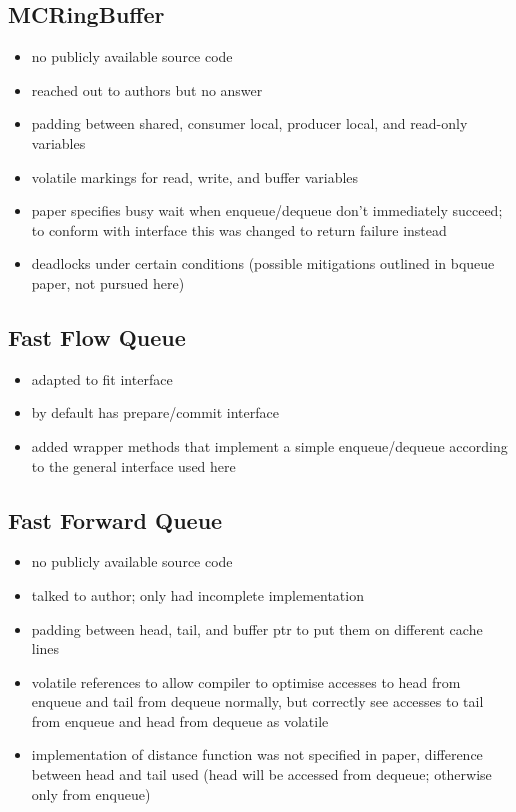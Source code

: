 \subsection{MCRingBuffer}
\begin{itemize}
    \item no publicly available source code
    \item reached out to authors but no answer
    \item padding between shared, consumer local, producer local, and read-only variables
    \item volatile markings for read, write, and buffer variables
    \item paper specifies busy wait when enqueue/dequeue don't immediately succeed; to conform with interface this was changed to return failure instead
    \item deadlocks under certain conditions (possible mitigations outlined in bqueue paper, not pursued here)
\end{itemize}

\subsection{Fast Flow Queue}
\begin{itemize}
    \item adapted to fit interface
    \item by default has prepare/commit interface
    \item added wrapper methods that implement a simple enqueue/dequeue according to the general interface used here
\end{itemize}

\subsection{Fast Forward Queue}
\begin{itemize}
    \item no publicly available source code
    \item talked to author; only had incomplete implementation
    \item padding between head, tail, and buffer ptr to put them on different cache lines
    \item volatile references to allow compiler to optimise accesses to head from enqueue and tail from dequeue normally, but correctly see accesses to tail from enqueue and head from dequeue as volatile
    \item implementation of distance function was not specified in paper, difference between head and tail used (head will be accessed from dequeue; otherwise only from enqueue)
\end{itemize}

